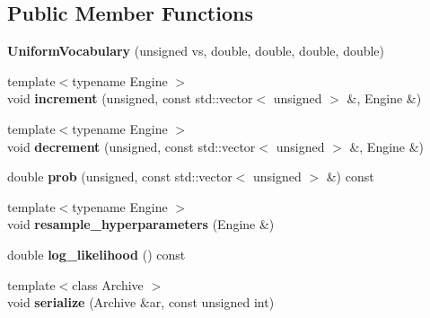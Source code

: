 \subsection*{Public Member Functions}
\begin{DoxyCompactItemize}
\item 
\mbox{\label{structcpyp_1_1_uniform_vocabulary_a9f7977faa77d41408c8cf18b61bb6311}} 
{\bfseries Uniform\+Vocabulary} (unsigned vs, double, double, double, double)
\item 
\mbox{\label{structcpyp_1_1_uniform_vocabulary_af6fe1630beb086b0e4d5ab894f49b6c0}} 
{\footnotesize template$<$typename Engine $>$ }\\void {\bfseries increment} (unsigned, const std\+::vector$<$ unsigned $>$ \&, Engine \&)
\item 
\mbox{\label{structcpyp_1_1_uniform_vocabulary_a7295a1b3487dc4ed6c8349f5d1bdcd80}} 
{\footnotesize template$<$typename Engine $>$ }\\void {\bfseries decrement} (unsigned, const std\+::vector$<$ unsigned $>$ \&, Engine \&)
\item 
\mbox{\label{structcpyp_1_1_uniform_vocabulary_af741559cf29e6ce5e60176c0ca5c6647}} 
double {\bfseries prob} (unsigned, const std\+::vector$<$ unsigned $>$ \&) const
\item 
\mbox{\label{structcpyp_1_1_uniform_vocabulary_ab65db811af65ef52f5e6fbe36f0d70ef}} 
{\footnotesize template$<$typename Engine $>$ }\\void {\bfseries resample\+\_\+hyperparameters} (Engine \&)
\item 
\mbox{\label{structcpyp_1_1_uniform_vocabulary_a690aa3198213c4984043baf9ed07bb4e}} 
double {\bfseries log\+\_\+likelihood} () const
\item 
\mbox{\label{structcpyp_1_1_uniform_vocabulary_ab7d2652fe8444150a332e3a2c0b77231}} 
{\footnotesize template$<$class Archive $>$ }\\void {\bfseries serialize} (Archive \&ar, const unsigned int)
\end{DoxyCompactItemize}
